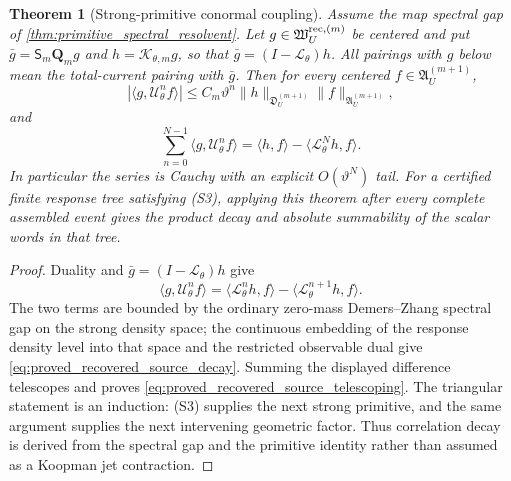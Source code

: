 \documentclass[11pt]{amsart}
\theoremstyle{compactplain}
\newtheorem{theorem}{Theorem}[section]
\theoremstyle{compactdefinition}
\theoremstyle{compactremark}
\newcommand{\Ltransfer}{\mathscr L}
\begin{document}
\begin{theorem}[Strong-primitive conormal coupling]
\label{thm:strong_primitive_conormal_coupling}
Assume the map spectral gap of
\cref{thm:primitive_spectral_resolvent}.  Let
\(g\in\mathfrak W_U^{{\rm rec},(m)}\) be centered and put
\(\bar g=\mathsf S_m\mathbf Q_mg\) and
\(h=\mathcal K_{\theta,m}g\), so that
\(\bar g=(I-\Ltransfer_\theta)h\).  All pairings with \(g\) below mean the
total-current pairing with \(\bar g\).  Then for every centered
\(f\in\mathfrak A_U^{(m+1)}\),
\begin{equation}
\label{eq:proved_recovered_source_decay}
 |\langle g,\mathscr U_\theta^n f\rangle|
 \le C_m\vartheta^n
   \|h\|_{\mathfrak D_U^{(m+1)}}
   \|f\|_{\mathfrak A_U^{(m+1)}} ,
\end{equation}
and
\begin{equation}
\label{eq:proved_recovered_source_telescoping}
 \sum_{n=0}^{N-1}\langle g,\mathscr U_\theta^n f\rangle
 =\langle h,f\rangle-\langle\Ltransfer_\theta^Nh,f\rangle.
\end{equation}
In particular the series is Cauchy with an explicit \(O(\vartheta^N)\) tail.
For a certified finite response tree satisfying (S3), applying this theorem
after every complete assembled event gives the product decay and absolute
summability of the scalar words in that tree.
\end{theorem}

\begin{proof}
Duality and \(\bar g=(I-\Ltransfer_\theta)h\) give
\[
 \langle g,\mathscr U_\theta^nf\rangle
 =\langle\Ltransfer_\theta^nh,f\rangle
  -\langle\Ltransfer_\theta^{n+1}h,f\rangle .
\]
The two terms are bounded by the ordinary zero-mass Demers--Zhang spectral gap
on the strong density space; the continuous embedding of the response density
level into that space and the restricted observable dual give
\eqref{eq:proved_recovered_source_decay}.  Summing the displayed difference
telescopes and proves
\eqref{eq:proved_recovered_source_telescoping}.  The triangular statement is
an induction: (S3) supplies the next strong primitive, and the same argument
supplies the next intervening geometric factor.  Thus correlation decay is
derived from the spectral gap and the primitive identity rather than assumed
as a Koopman jet contraction.
\end{proof}
\end{document}
